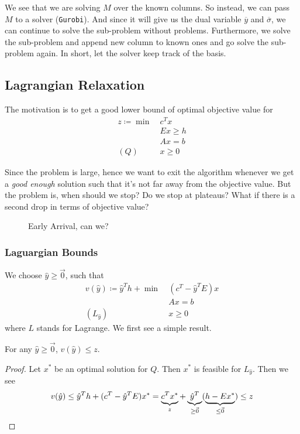 \begin{prev}
\begin{remark}
		\begin{note}
			We see that we are solving \(M\) over the known columns. So instead, we can pass \(M\) to a solver (\texttt{Gurobi}). And since
			it will give us the dual variable \(\overline{y}\) and \(\overline{\sigma}\), we can continue to solve the sub-problem without problems.
			Furthermore, we solve the sub-problem and append new column to known ones and go solve the sub-problem again. In short, let the solver
			keep track of the basis.
		\end{note}
	\end{remark}
\end{prev}

\subsection{Lagrangian Relaxation}
The motivation is to get a good lower bound of optimal objective value for
\begin{align*}
	z\coloneqq \min~ & c^{T}x    \\
	                 & Ex \geq h \\
	                 & Ax = b    \\
	(Q)\quad         & x\geq 0
\end{align*}

Since the problem is large, hence we want to exit the algorithm whenever we get a \emph{good enough} solution such that it's not far away from the objective
value. But the problem is, when should we stop? Do we stop at plateaus? What if there is a second drop in terms of objective value?

\begin{figure}[H]
	\centering
	\caption{Early Arrival, can we?}
	\label{fig:plateau}
\end{figure}

\subsubsection{Laguargian Bounds}
We choose \(\hat{y}\geq \vec{0}\), such that
\begin{align*}
	v(\hat{y})\coloneqq \hat{y}^{T}h + \min~ & (c^{T} - \hat{y}^{T}E)x \\
	                                         & Ax = b                  \\
	(L_{\hat{y}})\quad                       & x\geq 0
\end{align*}
where \(L\) stands for Lagrange. We first see a simple result.
\begin{lemma}
	For any \(\hat{y}\geq \vec{0}\), \(v(\hat{y})\leq z\).
\end{lemma}
\begin{proof}
	Let \(x^{*}\) be an optimal solution for \(Q\). Then \(x^{*}\) is feasible for \(L_{\hat{y}}\). Then we see
	\[
		v(\hat{y}) \leq \hat{y}^{T}h + (c^{T} - \hat{y}^{T} E )x^{*} = \underbrace{\vphantom{\hat{y}^{T}}c^{T}x^{*}}_{z} + \underbrace{\hat{y}^{T}}_{\geq \vec{0}}(\underbrace{\vphantom{\hat{y}^{T}}h - Ex^{*}}_{\leq \vec{0}}) \leq z
	\]
\end{proof}

